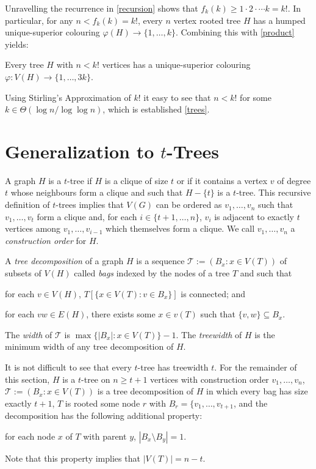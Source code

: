\documentclass[kpfonts]{patmorin}
\begin{document}
Unravelling the recurrence in \cref{recursion} shows that $f_k(k)\ge 1\cdot2\cdot\cdots k=k!$.  In particular, for any $n < f_k(k)=k!$, every $n$ vertex rooted tree $H$ has a humped unique-superior colouring $\varphi(H)\to\{1,\ldots,k\}$. Combining this with \cref{product} yields:

\begin{thm}
    Every tree $H$ with $n<k!$ vertices has a unique-superior colouring $\varphi:V(H)\to\{1,\ldots,3k\}$.
\end{thm}

Using Stirling's Approximation of $k!$ it easy to see that $n < k!$ for some $k\in\Theta(\log n/\log\log n)$, which is established \cref{trees}.

\section{Generalization to $t$-Trees}



A graph $H$ is a $t$-tree if $H$ is a clique of size $t$ or if it contains a vertex $v$ of degree $t$ whose neighbours form a clique and such that $H-\{t\}$ is a $t$-tree.  This recursive definition of $t$-trees implies that $V(G)$ can be ordered as $v_1,\ldots,v_n$ such that $v_1,\ldots,v_t$ form a clique and, for each $i\in\{t+1,\ldots,n\}$, $v_i$ is adjacent to exactly $t$ vertices among $v_1,\ldots,v_{i-1}$ which themselves form a clique.  We call $v_1,\ldots,v_n$ a \emph{construction order} for $H$.

A \emph{tree decomposition} of a graph $H$ is a sequence $\mathcal{T}:=(B_x:x\in V(T))$ of subsets of $V(H)$ called \emph{bags} indexed by the nodes of a tree $T$ and such that
\begin{inparaenum}[(i)]
    \item for each $v\in V(H)$, $T[\{x\in V(T):v\in B_x\}]$ is connected; and
    \item for each $vw\in E(H)$, there exists some $x\in v(T)$ such that $\{v,w\}\subseteq B_x$.
\end{inparaenum}
The \emph{width} of $\mathcal{T}$ is $\max\{|B_x|:x\in V(T)\}-1$. The \emph{treewidth} of $H$ is the minimum width of any tree decomposition of $H$.

It is not difficult to see that every $t$-tree has treewidth $t$.  For the remainder of this section, $H$ is a $t$-tree on $n\ge t+1$ vertices with construction order $v_1,\ldots,v_n$, $\mathcal{T}:=(B_x:x\in V(T))$ is a tree decomposition of $H$ in which every bag has size exactly $t+1$, $T$ is rooted some node $r$ with $B_r=\{v_1,\ldots,v_{t+1}$, and the decomposition has the following additional property:
\begin{inparaenum}[(i)]\setcounter{enumi}{2}
  \item for each node $x$ of $T$ with parent $y$, $|B_x\setminus B_y|=1$.
\end{inparaenum}
Note that this property implies that $|V(T)|=n-t$.
\end{document}
